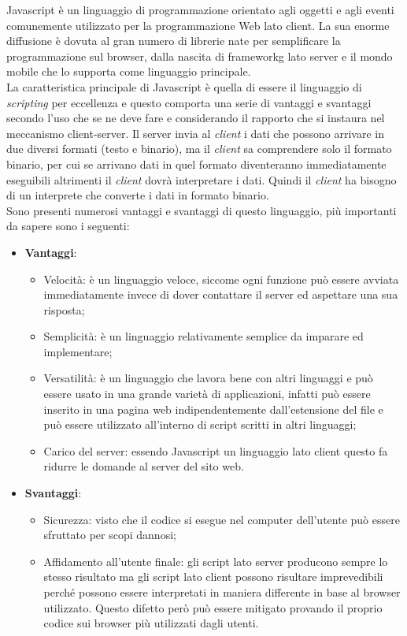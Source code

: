 Javascript è un linguaggio di programmazione orientato agli oggetti e agli eventi comunemente utilizzato per la programmazione Web lato client. La sua enorme diffusione è dovuta al gran numero di librerie nate per semplificare la programmazione sul browser, dalla nascita di \gls{frameworkg} lato server e il mondo mobile che lo supporta come linguaggio principale.\\
La caratteristica principale di Javascript è quella di essere il linguaggio di \textit{scripting} per eccellenza e questo comporta una serie di vantaggi e svantaggi secondo l'uso che se ne deve fare e considerando il rapporto che si instaura nel meccanismo client-server. Il server invia al \textit{client} i dati che possono arrivare in due diversi formati (testo e binario), ma il \textit{client} sa comprendere solo il formato binario, per cui se arrivano dati in quel formato diventeranno immediatamente eseguibili altrimenti il \textit{client} dovrà interpretare i dati. Quindi il \textit{client} ha bisogno di un interprete che converte i dati in formato binario.\\
Sono presenti numerosi vantaggi e svantaggi di questo linguaggio, più importanti da sapere sono i seguenti:
\begin{itemize}
	\item \textbf{Vantaggi}:
	\begin{itemize}
		\item Velocità: è un linguaggio veloce, siccome ogni funzione può essere avviata immediatamente invece di dover contattare il server ed aspettare una sua risposta;
		\item Semplicità: è un linguaggio relativamente semplice da imparare ed implementare;
		\item Versatilità: è un linguaggio che lavora bene con altri linguaggi e può essere usato in una grande varietà di applicazioni, infatti può essere inserito in una pagina web indipendentemente dall'estensione del file e può essere utilizzato all'interno di script scritti in altri linguaggi;
		\item Carico del server: essendo Javascript un linguaggio lato client questo fa ridurre le domande al server del sito web.
	\end{itemize}
	\item \textbf{Svantaggi}:
	\begin{itemize}
		\item Sicurezza: visto che il codice si esegue nel computer dell'utente può essere sfruttato per scopi dannosi;
		\item Affidamento all'utente finale: gli script lato server producono sempre lo stesso risultato ma gli script lato client possono risultare imprevedibili perché possono essere interpretati in maniera differente in base al browser utilizzato. Questo difetto però può essere mitigato provando il proprio codice sui browser più utilizzati dagli utenti.
	\end{itemize}
\end{itemize}

